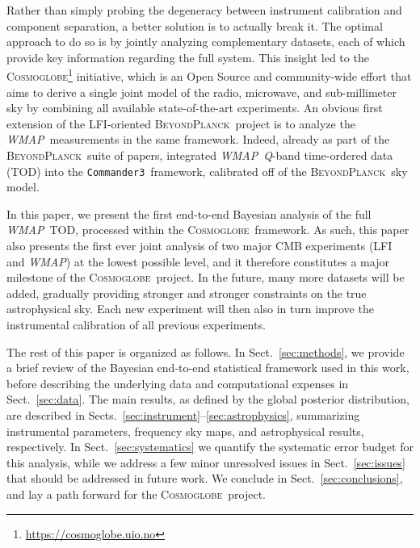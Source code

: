 \documentclass[twocolumn]{../../common/aa}
\def\WMAP{\emph{WMAP}}
\def\Planck{\emph{Planck}}
\def\commanderthree{\texttt{Commander3}}
\newcommand{\BP}{\textsc{BeyondPlanck}}
\newcommand{\cosmoglobe}{\textsc{Cosmoglobe}}
\newcommand{\Q}[0]{\textit Q}
\begin{document}
Rather than simply probing the degeneracy between instrument calibration and component separation, a better solution is to actually break it. The optimal approach to do so is by jointly analyzing complementary datasets, each of which provide key information regarding the full system. This insight led to the \cosmoglobe\footnote{\url{https://cosmoglobe.uio.no}} initiative, which is an Open Source and community-wide effort that aims to derive a single joint model of the radio, microwave, and sub-millimeter sky by combining all available state-of-the-art experiments. An obvious first extension of the LFI-oriented \BP\ project is to analyze the \WMAP\ measurements in the same framework. Indeed, already as part of the \BP\ suite of papers, \citet{bp17} integrated \WMAP\ \Q-band time-ordered data (TOD) into the \commanderthree\ framework, calibrated off of the \BP\ sky model.

In this paper, we present the first end-to-end Bayesian analysis of the full \WMAP\ TOD, processed within the \cosmoglobe\ framework. As such, this paper also presents the first ever joint analysis of two major CMB experiments (LFI and \WMAP) at the lowest possible level, and it therefore constitutes a major milestone of the \cosmoglobe\ project. In the future, many more datasets will be added, gradually providing stronger and stronger constraints on the true astrophysical sky. Each new experiment will then also in turn improve the instrumental calibration of all previous experiments. 

The rest of this paper is organized as follows. In Sect.~\ref{sec:methods}, we provide a brief review of the Bayesian end-to-end statistical framework used in this work, before describing the underlying data and computational expenses in Sect.~\ref{sec:data}. The main results, as defined by the global posterior distribution, are described in Sects.~\ref{sec:instrument}--\ref{sec:astrophysics}, summarizing instrumental parameters, frequency sky maps, and astrophysical results, respectively. In Sect.~\ref{sec:systematics} we quantify the systematic error budget for this analysis, while we address a few minor unresolved issues in Sect.~\ref{sec:issues} that should be addressed in future work. We conclude in Sect.~\ref{sec:conclusions}, and lay a path forward for the \cosmoglobe\ project.
\end{document}
